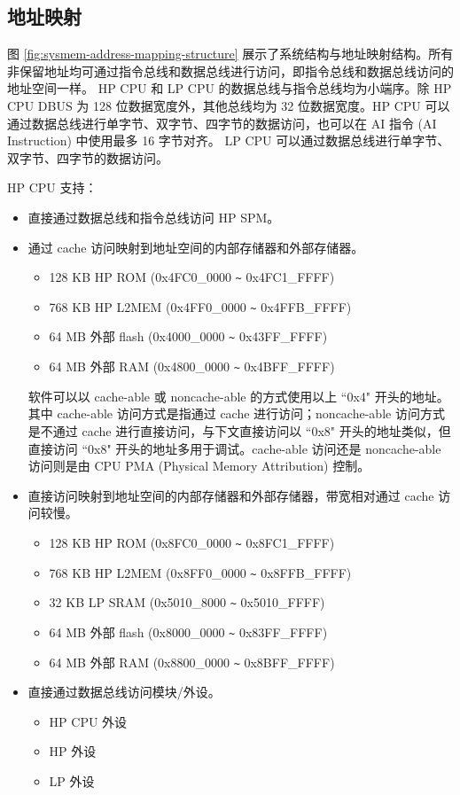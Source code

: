\documentclass[main\_\_CN.tex]{subfiles}
\begin{document}
\subsection{ 地址映射}

图 \ref{fig:sysmem-address-mapping-structure} 展示了系统结构与地址映射结构。所有非保留地址均可通过指令总线和数据总线进行访问，即指令总线和数据总线访问的地址空间一样。
HP CPU 和 LP CPU 的数据总线与指令总线均为小端序。除 HP CPU DBUS 为 128 位数据宽度外，其他总线均为 32 位数据宽度。HP CPU 可以通过数据总线进行单字节、双字节、四字节的数据访问，也可以在 AI 指令 (AI Instruction) 中使用最多 16 字节对齐。
LP CPU 可以通过数据总线进行单字节、双字节、四字节的数据访问。

HP CPU 支持：
\begin{itemize}
    \item 直接通过数据总线和指令总线访问 HP SPM。
    \item 通过 cache 访问映射到地址空间的内部存储器和外部存储器。
    \begin{itemize}
        \item 128 KB HP ROM (0x4FC0\_0000 \verb+~+ 0x4FC1\_FFFF)
        \item 768 KB HP L2MEM (0x4FF0\_0000 \verb+~+ 0x4FFB\_FFFF)
        \item 64 MB 外部 flash (0x4000\_0000 \verb+~+ 0x43FF\_FFFF)
        \item 64 MB 外部 RAM  (0x4800\_0000 \verb+~+ 0x4BFF\_FFFF)
    \end{itemize}
    \begin{tiplisting}
    软件可以以 cache-able 或 noncache-able 的方式使用以上 ``0x4" 开头的地址。其中 cache-able 访问方式是指通过 cache 进行访问；noncache-able 访问方式是不通过 cache 进行直接访问，与下文直接访问以 ``0x8" 开头的地址类似，但直接访问 ``0x8" 开头的地址多用于调试。cache-able 访问还是 noncache-able 访问则是由 CPU PMA (Physical Memory Attribution) 控制。
    \end{tiplisting}
    \item 直接访问映射到地址空间的内部存储器和外部存储器，带宽相对通过 cache 访问较慢。
    \begin{itemize}
        \item 128 KB HP ROM (0x8FC0\_0000 \verb+~+ 0x8FC1\_FFFF)
        \item 768 KB HP L2MEM (0x8FF0\_0000 \verb+~+ 0x8FFB\_FFFF)
        \item 32 KB LP SRAM (0x5010\_8000 \verb+~+ 0x5010\_FFFF)
        \item 64 MB 外部 flash (0x8000\_0000 \verb+~+ 0x83FF\_FFFF)
        \item 64 MB 外部 RAM (0x8800\_0000 \verb+~+ 0x8BFF\_FFFF)
    \end{itemize}
    \item 直接通过数据总线访问模块/外设。
    \begin{itemize}
        \item HP CPU 外设
        \item HP 外设
        \item LP 外设
    \end{itemize}
\end{itemize}
\end{document}
